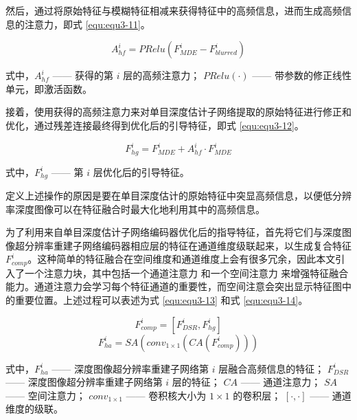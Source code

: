 然后，通过将原始特征与模糊特征相减来获得特征中的高频信息，进而生成高频信息的注意力，即式 \ref{equ:equ3-11}。

\begin{equation}
	A_{hf}^i=PRelu\left(F_{MDE}^i-F_{blurred}^i\right)
	\label{equ:equ3-11}
\end{equation}

\noindent 式中，$A_{hf}^i$ —— 获得的第 $i$ 层的高频注意力；\newline
\indent\quad $PRelu\left(\cdot\right)$ —— 带参数的修正线性单元，即激活函数。

接着，使用获得的高频注意力来对单目深度估计子网络提取的原始特征进行修正和优化，通过残差连接最终得到优化后的引导特征，即式 \ref{equ:equ3-12}。

\begin{equation}
	F_{hg}^i=F_{MDE}^i+A_{hf}^i\cdot F_{MDE}^i
	\label{equ:equ3-12}
\end{equation}

\noindent 式中，$F_{hg}^i$ —— 第 $i$ 层优化后的引导特征。

定义上述操作的原因是要在单目深度估计的原始特征中突显高频信息，以便低分辨率深度图像可以在特征融合时最大化地利用其中的高频信息。

为了利用来自单目深度估计子网络编码器优化后的指导特征，首先将它们与深度图像超分辨率重建子网络编码器相应层的特征在通道维度级联起来，以生成复合特征 $F_{comp}^i$。这种简单的特征融合在空间维度和通道维度上会有很多冗余，因此本文引入了一个注意力块，其中包括一个通道注意力 \cite{DBLP:conf/eccv/WooPLK18} 和一个空间注意力 \cite{DBLP:conf/eccv/WooPLK18} 来增强特征融合能力。通道注意力会学习每个特征通道的重要性，而空间注意会突出显示特征图中的重要位置。上述过程可以表述为式 \ref{equ:equ3-13} 和式 \ref{equ:equ3-14}。

\begin{equation}
	F_{comp}^i=\left[F_{DSR}^i,F_{hg}^i\right]
	\label{equ:equ3-13}
\end{equation}
\vspace{-0.8cm}
\begin{equation}
	F_{ha}^i=SA\left(conv_{1\times1}\left(CA\left(F_{comp}^i\right)\right)\right)
	\label{equ:equ3-14}
\end{equation}

\noindent 式中，$F_{ha}^i$ —— 深度图像超分辨率重建子网络第 $i$ 层融合高频信息的特征；\newline
\indent\quad $F_{DSR}^i$ —— 深度图像超分辨率重建子网络第 $i$ 层的特征；\newline
\indent\quad $CA$ —— 通道注意力；\newline
\indent\quad $SA$ —— 空间注意力；\newline
\indent\quad $conv_{1\times1}$ —— 卷积核大小为 $1\times 1$ 的卷积层；\newline
\indent\quad $\left[\cdot,\cdot\right]$ —— 通道维度的级联。

